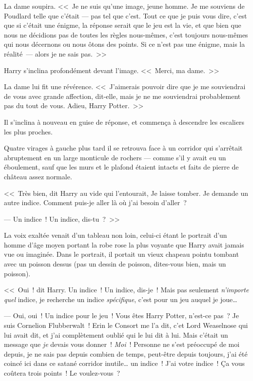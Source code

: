 La dame soupira. <<~Je ne suis qu'une image, jeune homme. Je me souviens de Poudlard telle que c'était — pas tel que c'est. Tout ce que je puis vous dire, c'est que si c'était une énigme, la réponse serait que le jeu est la vie, et que bien que nous ne décidions pas de toutes les règles nous-mêmes, c'est toujours nous-mêmes qui nous décernons ou nous ôtons des points. Si ce n'est pas une énigme, mais la réalité~— alors je ne sais pas.~>>

Harry s'inclina profondément devant l'image. <<~Merci, ma dame.~>>

La dame lui fit une révérence. <<~J'aimerais pouvoir dire que je me souviendrai de vous avec grande affection, dit-elle, mais je ne me souviendrai probablement pas du tout de vous. Adieu, Harry Potter.~>>

Il s'inclina à nouveau en guise de réponse, et commença à descendre les escaliers les plus proches.

Quatre virages à gauche plus tard il se retrouva face à un corridor qui s'arrêtait abruptement en un large monticule de rochers — comme s'il y avait eu un éboulement, sauf que les murs et le plafond étaient intacts et faits de pierre de château assez normale.

<<~Très bien, dit Harry au vide qui l'entourait, Je laisse tomber. Je demande un autre indice. Comment puis-je aller là où j'ai besoin d'aller~?

--- Un indice~! Un indice, dis-tu~?~>>

La voix exaltée venait d'un tableau non loin, celui-ci étant le portrait d'un homme d'âge moyen portant la robe rose la plus voyante que Harry avait jamais vue ou imaginée. Dans le portrait, il portait un vieux chapeau pointu tombant avec un poisson dessus (pas un dessin de poisson, dites-vous bien, mais un poisson).

<<~Oui~! dit Harry. Un indice~! Un indice, dis-je~! Mais pas seulement \emph{n'importe quel} indice, je recherche un indice \emph{spécifique}, c'est pour un jeu auquel je joue…

--- Oui, oui~! Un indice pour le jeu~! Vous êtes Harry Potter, n'est-ce pas~? Je suis Cornelion Flubberwalt~! Erin le Consort me l'a dit, c’et Lord Weaselnose qui lui avait dit, et j’ai complètement oublié qui le lui dit à lui. Mais c'était un message que \emph{je} devais vous donner~! \emph{Moi}~! Personne ne s'est préoccupé de moi depuis, je ne sais pas depuis combien de temps, peut-être depuis toujours, j'ai été coincé ici dans ce satané corridor inutile… un indice~! J'ai votre indice~! Ça vous coûtera trois points~! Le voulez-vous~?

